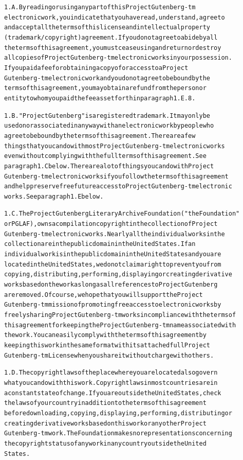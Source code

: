 \documentclass[12pt]{book}[2005/09/16]
\newenvironment{PGtext}{%
\begin{alltt}
\fontsize{8.1}{10}\ttfamily\selectfont}%
{\end{alltt}}
\renewcommand{\(}{{\upshape(}}
\renewcommand{\)}{{\upshape)}}
\begin{document}
\begin{PGtext}
1.A.  By reading or using any part of this Project Gutenberg-tm
electronic work, you indicate that you have read, understand, agree to
and accept all the terms of this license and intellectual property
(trademark/copyright) agreement.  If you do not agree to abide by all
the terms of this agreement, you must cease using and return or destroy
all copies of Project Gutenberg-tm electronic works in your possession.
If you paid a fee for obtaining a copy of or access to a Project
Gutenberg-tm electronic work and you do not agree to be bound by the
terms of this agreement, you may obtain a refund from the person or
entity to whom you paid the fee as set forth in paragraph 1.E.8.

1.B.  "Project Gutenberg" is a registered trademark.  It may only be
used on or associated in any way with an electronic work by people who
agree to be bound by the terms of this agreement.  There are a few
things that you can do with most Project Gutenberg-tm electronic works
even without complying with the full terms of this agreement.  See
paragraph 1.C below.  There are a lot of things you can do with Project
Gutenberg-tm electronic works if you follow the terms of this agreement
and help preserve free future access to Project Gutenberg-tm electronic
works.  See paragraph 1.E below.

1.C.  The Project Gutenberg Literary Archive Foundation ("the Foundation"
or PGLAF), owns a compilation copyright in the collection of Project
Gutenberg-tm electronic works.  Nearly all the individual works in the
collection are in the public domain in the United States.  If an
individual work is in the public domain in the United States and you are
located in the United States, we do not claim a right to prevent you from
copying, distributing, performing, displaying or creating derivative
works based on the work as long as all references to Project Gutenberg
are removed.  Of course, we hope that you will support the Project
Gutenberg-tm mission of promoting free access to electronic works by
freely sharing Project Gutenberg-tm works in compliance with the terms of
this agreement for keeping the Project Gutenberg-tm name associated with
the work.  You can easily comply with the terms of this agreement by
keeping this work in the same format with its attached full Project
Gutenberg-tm License when you share it without charge with others.

1.D.  The copyright laws of the place where you are located also govern
what you can do with this work.  Copyright laws in most countries are in
a constant state of change.  If you are outside the United States, check
the laws of your country in addition to the terms of this agreement
before downloading, copying, displaying, performing, distributing or
creating derivative works based on this work or any other Project
Gutenberg-tm work.  The Foundation makes no representations concerning
the copyright status of any work in any country outside the United
States.


\end{PGtext}
\end{document}
